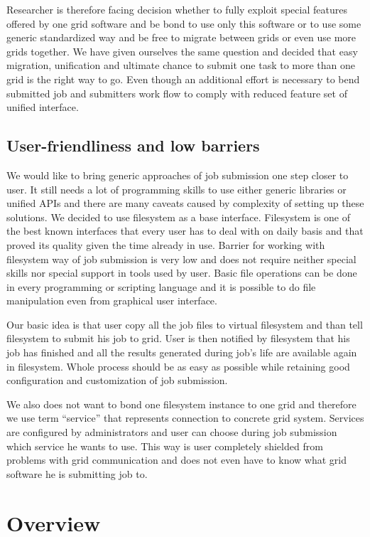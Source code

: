 \documentclass[a4paper,10pt,twocolumn]{article}
\newcommand{\term}[1]{``#1''}
\begin{document}
Researcher is therefore facing decision whether to fully exploit special features offered by one grid software and be bond to use only this software or to use some generic standardized way and be free to migrate between grids or even use more grids together. We have given ourselves the same question and decided that easy migration, unification and ultimate chance to submit one task to more than one grid is the right way to go. Even though an additional effort is necessary to bend submitted job and submitters work flow to comply with reduced feature set of unified interface.


\subsection{User-friendliness and low barriers}
We would like to bring generic approaches of job submission one step closer to user. It still needs a lot of programming skills to use either generic libraries or unified APIs and there are many caveats caused by complexity of setting up these solutions. We decided to use filesystem as a base interface. Filesystem is one of the best known interfaces that every user has to deal with on daily basis and that proved its quality given the time already in use. Barrier for working with filesystem way of job submission is very low and does not require neither special skills nor special support in tools used by user. Basic file operations can be done in every programming or scripting language and it is possible to do file manipulation even from graphical user interface.

Our basic idea is that user copy all the job files to virtual filesystem and than tell filesystem to submit his job to grid. User is then notified by filesystem that his job has finished and all the results generated during job's life are available again in filesystem. Whole process should be as easy as possible while retaining good configuration and customization of job submission. 

We also does not want to bond one filesystem instance to one grid and therefore we use term \term{service} that represents connection to concrete grid system. Services are configured by administrators and user can choose during job submission which service he wants to use. This way is user completely shielded from problems with grid communication and does not even have to know what grid software he is submitting job to.



\section{Overview}
\end{document}
